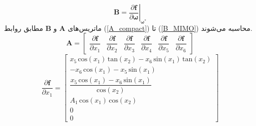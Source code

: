 \begin{equation}
	\boldsymbol B = \left.\dfrac{\partial \boldsymbol f}{\partial \boldsymbol \omega}\right\vert_{\boldsymbol{\omega^*}}
\end{equation}
ماتریس‌های $\boldsymbol A$ و $\boldsymbol B$ مطابق روابط
(\ref{A_compact})
تا
(\ref{B_MIMO})
محاسبه می‌شوند.
\begin{equation}\label{A_compact}
	\boldsymbol A = \begin{bmatrix}
		\dfrac{\partial \boldsymbol{ f}}{\partial  x_1} &
		\dfrac{\partial \boldsymbol{ f}}{\partial  x_2} &
		\dfrac{\partial \boldsymbol{ f}}{\partial  x_3} &
		\dfrac{\partial \boldsymbol{ f}}{\partial  x_4} &
		\dfrac{\partial \boldsymbol{ f}}{\partial  x_5} &
		\dfrac{\partial \boldsymbol{ f}}{\partial  x_6} 
	\end{bmatrix}
\end{equation}
\begin{equation}
	 \dfrac{\partial \boldsymbol{ f}}{\partial  x_1} = 
	 \begin{bmatrix}
	 	x_5 \,\mathrm{cos}\left(x_1 \right)\,\mathrm{tan}\left(x_2 \right)-x_6 \,\mathrm{sin}\left(x_1 \right)\,\mathrm{tan}\left(x_2 \right)\\
	 	-x_6 \,\mathrm{cos}\left(x_1 \right)-x_5 \,\mathrm{sin}\left(x_1 \right)\\[0.5em]
	 	\dfrac{x_5 \,\mathrm{cos}\left(x_1 \right)-x_6 \,\mathrm{sin}\left(x_1 \right)}{\mathrm{cos}\left(x_2 \right)}\\
	 	A_1 \,\mathrm{cos}\left(x_1 \right)\,\mathrm{cos}\left(x_2 \right)\\
	 	0\\
	 	0
	 \end{bmatrix}
\end{equation}
